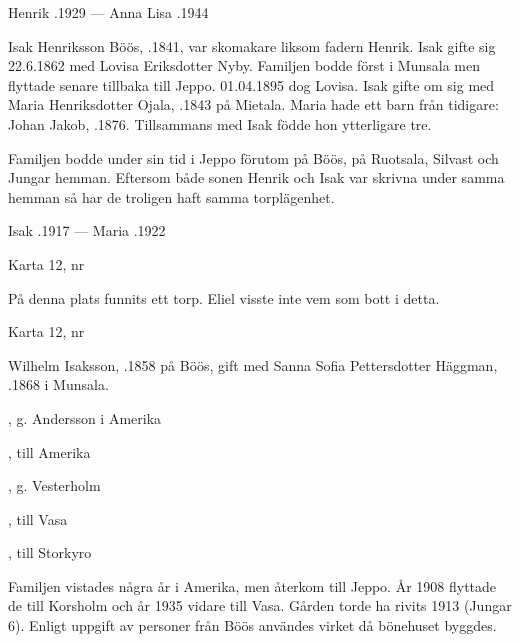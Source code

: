 Henrik .1929  ---  Anna Lisa .1944


Isak Henriksson Böös, .1841, var skomakare liksom fadern Henrik. Isak gifte sig 22.6.1862 med Lovisa Eriksdotter Nyby. Familjen bodde först i Munsala men flyttade senare tillbaka till Jeppo. 01.04.1895 dog Lovisa. Isak gifte om sig med Maria Henriksdotter Ojala, .1843 på Mietala. Maria hade ett barn från tidigare: Johan Jakob, .1876. Tillsammans med Isak födde hon ytterligare tre.
\begin{jhchildren}
  \item {}
  \item {}
  \item {}
\end{jhchildren}
Familjen bodde under sin tid i Jeppo förutom på Böös, på Ruotsala, Silvast och Jungar hemman. Eftersom både sonen Henrik och Isak var skrivna under samma hemman så har de troligen haft samma torplägenhet.

Isak .1917  ---  Maria .1922


Karta 12,   nr 

På denna plats funnits ett torp. Eliel visste inte vem som bott i detta.


Karta 12,   nr 


Wilhelm Isaksson, .1858 på Böös, gift med Sanna Sofia Pettersdotter Häggman, .1868 i Munsala.
\begin{jhchildren}
  \item {}, g. Andersson i Amerika
  \item {}, till Amerika
  \item {}
  \item {}, g. Vesterholm
  \item {}, till Vasa
  \item {}, till Storkyro
\end{jhchildren}
Familjen vistades några år i Amerika, men återkom till Jeppo. År 1908 flyttade de till Korsholm och år 1935 vidare till Vasa. Gården torde ha rivits 1913 (Jungar 6). Enligt uppgift av personer från Böös användes virket då bönehuset byggdes.

